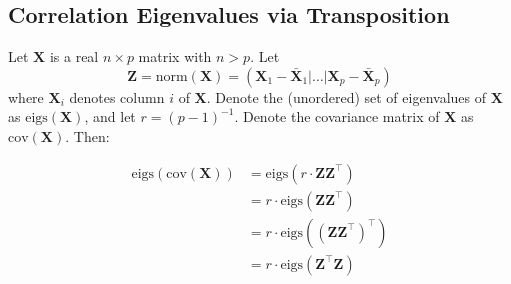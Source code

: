 \documentclass[12pt]{spieman}  %
\begin{document}
\begin{spacing}{2}


\appendix    %

\section{Correlation Eigenvalues via Transposition}
\label{sec:transpose}

Let \(\mathbf{X}\) is a real \(n \times p\) matrix with \(n > p\). Let
\[
\mathbf{Z} = \text{norm}(\mathbf{X}) =
\left(
\mathbf{X}_1 - \bar{\mathbf{X}}_1 | \dots | \mathbf{X}_p - \bar{\mathbf{X}}_p
\right)
\]
where \(\mathbf{X}_i\) denotes column \(i\) of \(\mathbf{X}\). Denote the (unordered) set
of eigenvalues of \(\mathbf{X}\) as \(\text{eigs}(\mathbf{X})\), and let \(r = (p - 1)^{-1}\).
Denote the covariance matrix of \(\mathbf{X}\) as \(\text{cov}(\mathbf{X})\).  Then:

\begin{align*}
\text{eigs}\left( \text{cov}(\mathbf{X})  \right)
&= \text{eigs}(r \cdot \mathbf{Z}\mathbf{Z}^{\top}) \\
&= r \cdot \text{eigs}(\mathbf{Z}\mathbf{Z}^{\top}) \\
&= r \cdot \text{eigs}((\mathbf{Z}\mathbf{Z}^{\top})^{\top}) \\
&= r \cdot \text{eigs}(\mathbf{Z}^{\top}\mathbf{Z}) \\
\end{align*}


\end{spacing}
\end{document}

